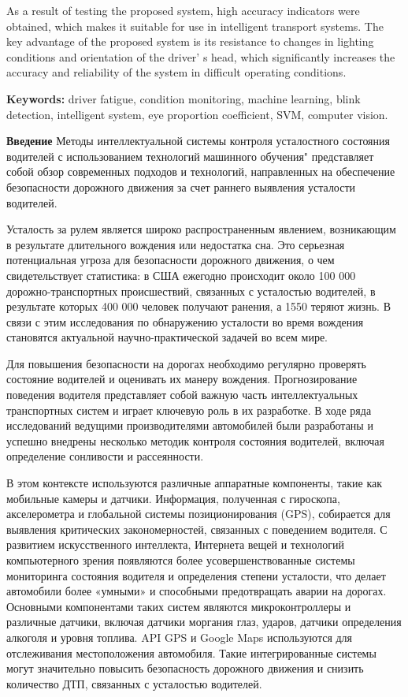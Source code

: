 As a result of testing the proposed system, high accuracy indicators
were obtained, which makes it suitable for use in intelligent transport
systems. The key advantage of the proposed system is its resistance to
changes in lighting conditions and orientation of the
driver' s head, which significantly increases the
accuracy and reliability of the system in difficult operating
conditions.

{\bfseries Keywords:} driver fatigue, condition monitoring, machine
learning, blink detection, intelligent system, eye proportion
coefficient, SVM, computer vision.

{\bfseries Введение} Методы интеллектуальной системы контроля усталостного
состояния водителей с использованием технологий машинного обучения"
представляет собой обзор современных подходов и технологий, направленных
на обеспечение безопасности дорожного движения за счет раннего выявления
усталости водителей.

Усталость за рулем является широко распространенным явлением,
возникающим в результате длительного вождения или недостатка сна. Это
серьезная потенциальная угроза для безопасности дорожного движения, о
чем свидетельствует статистика: в США ежегодно происходит около 100 000
дорожно-транспортных происшествий, связанных с усталостью водителей, в
результате которых 400 000 человек получают ранения, а 1550 теряют
жизнь. В связи с этим исследования по обнаружению усталости во время
вождения становятся актуальной научно-практической задачей во всем мире.

Для повышения безопасности на дорогах необходимо регулярно проверять
состояние водителей и оценивать их манеру вождения. Прогнозирование
поведения водителя представляет собой важную часть интеллектуальных
транспортных систем и играет ключевую роль в их разработке. В ходе ряда
исследований ведущими производителями автомобилей были разработаны и
успешно внедрены несколько методик контроля состояния водителей, включая
определение сонливости и рассеянности.

В этом контексте используются различные аппаратные компоненты, такие как
мобильные камеры и датчики. Информация, полученная с гироскопа,
акселерометра и глобальной системы позиционирования (GPS), собирается
для выявления критических закономерностей, связанных с поведением
водителя. С развитием искусственного интеллекта, Интернета вещей и
технологий компьютерного зрения появляются более усовершенствованные
системы мониторинга состояния водителя и определения степени усталости,
что делает автомобили более «умными» и способными предотвращать аварии
на дорогах. Основными компонентами таких систем являются
микроконтроллеры и различные датчики, включая датчики моргания глаз,
ударов, датчики определения алкоголя и уровня топлива. API GPS и Google
Maps используются для отслеживания местоположения автомобиля. Такие
интегрированные системы могут значительно повысить безопасность
дорожного движения и снизить количество ДТП, связанных с усталостью
водителей.

